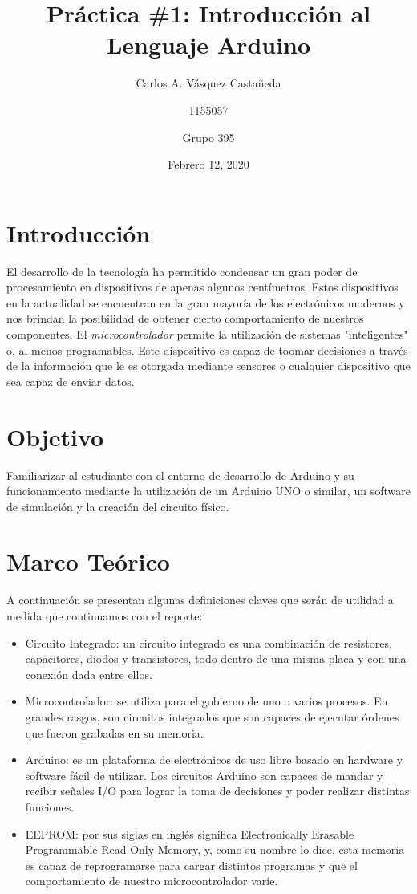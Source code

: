 \documentclass[12pt, letterpaper]{article}
\title{Práctica \#1: Introducción al Lenguaje Arduino}
\author{Carlos A. Vásquez Castañeda \and 1155057 \and Grupo 395}
\date{Febrero 12, 2020}
\begin{document}
\maketitle
\section*{Introducción}
El desarrollo de la tecnología ha permitido condensar un gran poder de procesamiento en dispositivos de apenas algunos centímetros. Estos dispositivos en la actualidad se encuentran en la gran mayoría de los electrónicos modernos y nos brindan la posibilidad de obtener cierto comportamiento de nuestros componentes. El \textit{microcontrolador} permite la utilización de sistemas "inteligentes" o, al menos programables.\autocite{upc} Este dispositivo es capaz de toomar decisiones a través de la información que le es otorgada mediante sensores o cualquier dispositivo que sea capaz de enviar datos.
\section*{Objetivo}
Familiarizar al estudiante con el entorno de desarrollo de Arduino y su funcionamiento mediante la utilización de un Arduino UNO o similar, un software de simulación y la creación del circuito físico.

\section*{Marco Teórico}

A continuación se presentan algunas definiciones claves que serán de utilidad a medida que continuamos con el reporte:
\begin{itemize}
	\item Circuito Integrado: un circuito integrado es una combinación de resistores, capacitores, diodos y transistores, todo dentro de una misma placa y con una conexión dada entre ellos. \autocite{jones20}
	\item Microcontrolador: se utiliza para el gobierno de uno o varios procesos. En grandes rasgos, son circuitos integrados que son capaces de ejecutar órdenes que fueron grabadas en su memoria.
	\item Arduino: es un plataforma de electrónicos de uso libre basado en hardware y software fácil de utilizar. Los circuitos Arduino son capaces de mandar y recibir señales I/O para lograr la toma de decisiones y poder realizar distintas funciones.\autocite{ard20}
	\item EEPROM: por sus siglas en inglés significa Electronically Erasable Programmable Read Only Memory, y, como su nombre lo dice, esta memoria es capaz de reprogramarse para cargar distintos programas y que el comportamiento de nuestro microcontrolador varíe.
\end{itemize}
\end{document}
